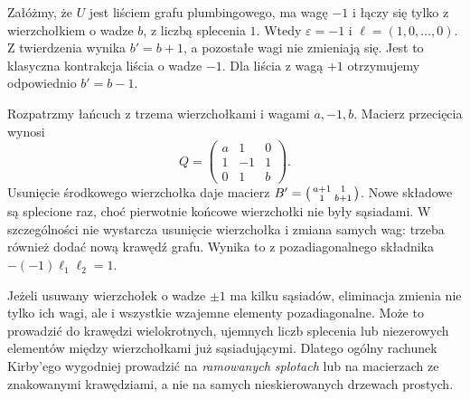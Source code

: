 \begin{przyklad}
Załóżmy, że $U$ jest liściem grafu plumbingowego,
ma wagę $-1$ i łączy się tylko z wierzchołkiem
o wadze $b$, z liczbą splecenia $1$.
Wtedy $\varepsilon=-1$ i $\ell=(1,0,\ldots,0)$.
Z twierdzenia wynika $b'=b+1$, a pozostałe wagi
nie zmieniają się. Jest to klasyczna kontrakcja
liścia o wadze $-1$. Dla liścia z wagą $+1$
otrzymujemy odpowiednio $b'=b-1$.
\end{przyklad}

\begin{przyklad}
Rozpatrzmy łańcuch z trzema wierzchołkami i wagami
$a,-1,b$. Macierz przecięcia wynosi
\[
Q=\begin{pmatrix}a&1&0\\1&-1&1\\0&1&b\end{pmatrix}.
\]
Usunięcie środkowego wierzchołka daje macierz
$B'=\begin{psmallmatrix}a+1&1\\1&b+1\end{psmallmatrix}$.
Nowe składowe są splecione raz, choć pierwotnie
końcowe wierzchołki nie były sąsiadami.
W szczególności nie wystarcza usunięcie wierzchołka
i zmiana samych wag: trzeba również dodać nową
krawędź grafu. Wynika to z pozadiagonalnego składnika
$-(-1)\ell_1\ell_2=1$.
\end{przyklad}

\begin{center}
\end{center}

\begin{uwaga}
Jeżeli usuwany wierzchołek o wadze $\pm1$ ma
kilku sąsiadów, eliminacja zmienia nie tylko ich
wagi, ale i wszystkie wzajemne elementy pozadiagonalne.
Może to prowadzić do krawędzi wielokrotnych,
ujemnych liczb splecenia lub niezerowych elementów
między wierzchołkami już sąsiadującymi. Dlatego
ogólny rachunek Kirby'ego wygodniej prowadzić
na \emph{ramowanych splotach} lub na macierzach
ze znakowanymi krawędziami, a nie na samych
nieskierowanych drzewach prostych.
\end{uwaga}

